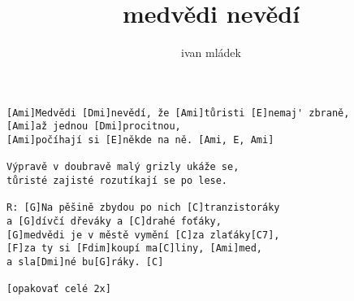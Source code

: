 \author{ivan mládek}
\title{medvědi nevědí}
\maketitle
\begin{verbatim}
[Ami]Medvědi [Dmi]nevědí, že [Ami]tůristi [E]nemaj' zbraně,
[Ami]až jednou [Dmi]procitnou, 
[Ami]počíhají si [E]někde na ně. [Ami, E, Ami]

Výpravě v doubravě malý grizly ukáže se,
tůristé zajisté rozutíkají se po lese.

R: [G]Na pěšině zbydou po nich [C]tranzistoráky
a [G]dívčí dřeváky a [C]drahé foťáky,
[G]medvědi je v městě vymění [C]za zlaťáky[C7],
[F]za ty si [Fdim]koupí ma[C]liny, [Ami]med,
a sla[Dmi]né bu[G]ráky. [C]

[opakovať celé 2x]
\end{verbatim}
